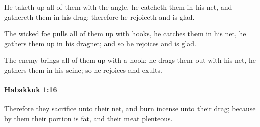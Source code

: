 			\begin{versebox}
					\item[BHS] 
					\item[LXX] 
					\item[ASV] He taketh up all of them with the angle, he catcheth them in his net, and gathereth them in his drag: therefore he rejoiceth and is glad.
					\item[NIV] The wicked foe pulls all of them up with hooks, he catches them in his net, he gathers them up in his dragnet; and so he rejoices and is glad.
					\item[NRSV] The enemy brings all of them up with a hook; he drags them out with his net, he gathers them in his seine; so he rejoices and exults.
			\end{versebox}

		\paragraph{Habakkuk 1:16} %
			\label{HABAKKUK-1-16}

			Therefore they sacrifice unto their net, and burn incense unto their drag; because by them their portion is fat, and their meat plenteous.

